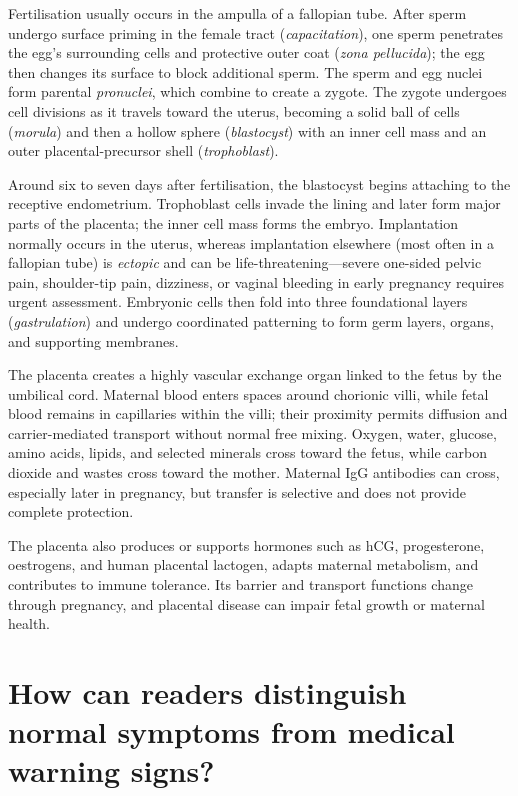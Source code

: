 \documentclass[11pt,oneside]{report}
\begin{document}
Fertilisation usually occurs in the ampulla of a fallopian tube. After sperm
undergo surface priming in the female tract (\emph{capacitation}), one sperm
penetrates the egg's surrounding cells and protective outer coat (\emph{zona
pellucida}); the egg then changes its surface to block additional sperm. The
sperm and egg nuclei form parental \emph{pronuclei}, which combine to create a
zygote. The zygote undergoes cell divisions as it travels toward the uterus,
becoming a solid ball of cells (\emph{morula}) and then a hollow sphere
(\emph{blastocyst}) with an inner cell mass and an outer placental-precursor
shell (\emph{trophoblast}).

Around six to seven days after fertilisation, the blastocyst begins attaching to
the receptive endometrium. Trophoblast cells invade the lining and later form
major parts of the placenta; the inner cell mass forms the embryo. Implantation
normally occurs in the uterus, whereas implantation elsewhere (most often in a
fallopian tube) is \emph{ectopic} and can be life-threatening—severe one-sided
pelvic pain, shoulder-tip pain, dizziness, or vaginal bleeding in early
pregnancy requires urgent assessment. Embryonic cells then fold into three
foundational layers (\emph{gastrulation}) and undergo coordinated patterning to
form germ layers, organs, and supporting membranes.

The placenta creates a highly vascular exchange organ linked to the fetus by
the umbilical cord. Maternal blood enters spaces around chorionic villi, while
fetal blood remains in capillaries within the villi; their proximity permits
diffusion and carrier-mediated transport without normal free mixing. Oxygen,
water, glucose, amino acids, lipids, and selected minerals cross toward the
fetus, while carbon dioxide and wastes cross toward the mother. Maternal IgG
antibodies can cross, especially later in pregnancy, but transfer is selective
and does not provide complete protection.

The placenta also produces or supports hormones such as hCG, progesterone,
oestrogens, and human placental lactogen, adapts maternal metabolism, and
contributes to immune tolerance. Its barrier and transport functions change
through pregnancy, and placental disease can impair fetal growth or maternal
health.

\section{How can readers distinguish normal symptoms from medical warning signs?}
\end{document}

